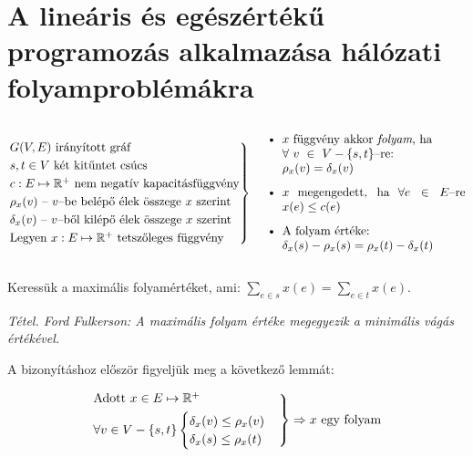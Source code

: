 \newpage
\section{A lineáris és egészértékű programozás alkalmazása hálózati folyamproblémákra}

\[
\begin{rcases}
G(V,E) \mbox{ irányított gráf} \\
s,t \in V \mbox{ két kitűntet csúcs} \\
c : E \mapsto \mathbb{R}^+ \mbox{ nem negatív kapacitásfüggvény}\\
\rho_x(v) \mbox{ -- } v\mbox{--be belépő élek összege } x \mbox{ szerint} \\
\delta_x(v) \mbox{ -- } v\mbox{--ből kilépő élek összege } x \mbox{ szerint}\\
\mbox{Legyen }x : E \mapsto \mathbb{R}^+ \mbox{ tetszőleges függvény}
\end{rcases} \parbox[c]{6.2cm}{
\begin{itemize}
  \item $x$ függvény akkor \emph{folyam}, ha \\ $\forall~v~\in~V - \{s,t\}$--re: \\ $\rho_x(v)=\delta_x(v)$
  \item $x$ megengedett, ha $\forall e \in E$--re $x(e) \leq c(e)$
  \item A folyam értéke: \\ $\delta_x(s)-\rho_x(s)=\rho_x(t)-\delta_x(t)$
\end{itemize}
}
\]

Keressük a maximális folyamértéket, ami: $\sum_{e \in s}x(e)=\sum_{e \in t}x(e)$. 

\vspace{0.4cm}
\emph{Tétel. Ford Fulkerson: A maximális folyam értéke megegyezik a minimális vágás értékével.}
\vspace{0.4cm}

A bizonyításhoz először figyeljük meg a következő lemmát: 

\[
\begin{rcases}
\mbox{Adott } x \in E \mapsto \mathbb{R}^+\\
\forall v \in V - \{s,t\} \begin{cases}
\delta_x(v) \leq \rho_x(v) \\
\delta_x(s) \leq \rho_x(t)
\end{cases} 
\end{rcases}
\Rightarrow  x \mbox{ egy folyam}
\]


